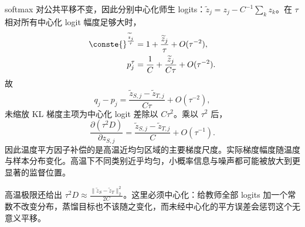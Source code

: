 \documentclass[../textbook.tex]{subfiles}
\begin{document}
softmax 对公共平移不变，因此分别中心化师生 logits：$\widetilde z_j=z_j-C^{-1}\sum_k z_k$。在 $\tau$ 相对所有中心化 logit 幅度足够大时，
\begin{equation}
\begin{aligned}
 \conste{}^{\frac{\widetilde z_j}{\tau}} &= 1+\frac{\widetilde z_j}{\tau}+O(\tau^{-2}), \\
 p_j^\tau &= \frac1C+\frac{\widetilde z_j}{C\tau}+O(\tau^{-2}).
\end{aligned}
\end{equation}
故
\begin{equation}
 q_j-p_j=\frac{\widetilde z_{S,j}-\widetilde z_{T,j}}{C\tau}+O(\tau^{-2}),
\end{equation}
未缩放 KL 梯度主项为中心化 logit 差除以 $C\tau^2$。乘以 $\tau^2$ 后，
\begin{equation}
 \frac{\partial(\tau^2D)}{\partial z_{S,j}}
 =\frac{\widetilde z_{S,j}-\widetilde z_{T,j}}C+O(\tau^{-1}).
\end{equation}
因此温度平方因子补偿的是高温近均匀区域的主要梯度尺度。实际梯度幅度随温度与样本分布变化。高温下不同类别近乎均匀，小概率信息与噪声都可能被放大到更显著的监督位置。

高温极限还给出 $\tau^2D\approx\frac{\|\widetilde z_S-\widetilde z_T\|_2^2}{2C}$。这里必须中心化：给教师全部 logits 加一个常数不改变分布，蒸馏目标也不该随之变化，而未经中心化的平方误差会惩罚这个无意义平移。
\end{document}
